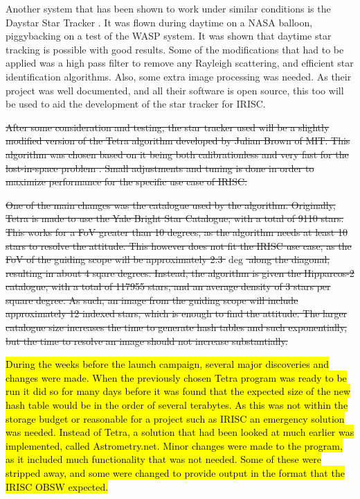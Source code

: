 Another system that has been shown to work under similar conditions is the Daystar Star Tracker \cite{daystar}. It was flown during daytime on a NASA balloon, piggybacking on a test of the WASP system. It was shown that daytime star tracking is possible with good results. Some of the modifications that had to be applied was a high pass filter to remove any Rayleigh scattering, and efficient star identification algorithms. Also, some extra image processing was needed. As their project was well documented, and all their software is open source, this too will be used to aid the development of the star tracker for IRISC.

\st{After some consideration and testing, the star tracker used will be a slightly modified version of the Tetra algorithm developed by Julian Brown of MIT. This algorithm was chosen based on it being both calibrationless and very fast for the lost-in-space problem \mbox{\cite{tetra}}. Small adjustments and tuning is done in order to maximize performance for the specific use case of IRISC.}

\st{One of the main changes was the catalogue used by the algorithm. Originally, Tetra is made to use the Yale Bright Star Catalogue, with a total of 9110 stars. This works for a FoV greater than 10 degrees, as the algorithm needs at least 10 stars to resolve the attitude. This however does not fit the IRISC use case, as the FoV of the guiding scope will be approximately 2.3 $\deg$ along the diagonal, resulting in about 4 sqare degrees. Instead, the algorithm is given the Hipparcos-2 catalogue, with a total of 117955 stars, and an average density of 3 stars per square degree. As such, an image from the guiding scope will include approximately 12 indexed stars, which is enough to find the attitude. The larger catalogue size increases the time to generate hash tables and such exponentially, but the time to resolve an image should not increase substantially.}

\hl{During the weeks before the launch campaign, several major discoveries and changes were made. When the previously chosen Tetra program was ready to be run it did so for many days before it was found that the expected size of the new hash table would be in the order of several terabytes. As this was not within the storage budget or reasonable for a project such as IRISC an emergency solution was needed. Instead of Tetra, a solution that had been looked at much earlier was implemented, called Astrometry.net. Minor changes were made to the program, as it included much functionality that was not needed. Some of these were stripped away, and some were changed to provide output in the format that the IRISC OBSW expected.}

